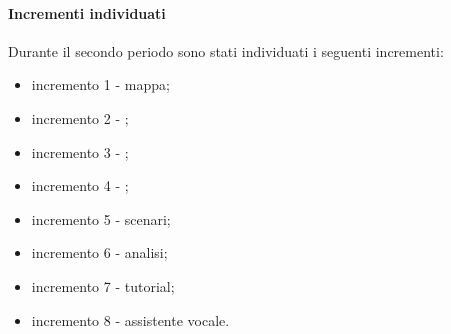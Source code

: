 		\paragraph{Incrementi individuati}
		Durante il secondo periodo sono stati individuati i seguenti incrementi:
		\begin{itemize}
			\item incremento 1 - mappa;
			\item incremento 2 - ;
			\item incremento 3 - ;
			\item incremento 4 - ;
			\item incremento 5 - scenari;
			\item incremento 6 - analisi;
			\item incremento 7 - tutorial;
			\item incremento 8 - assistente vocale.
		\end{itemize}
